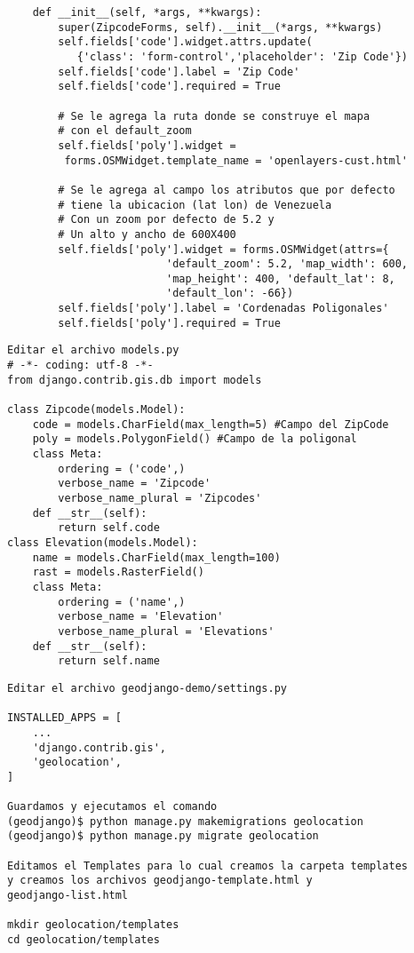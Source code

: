 \documentclass[xcolor=dvipsnames]{beamer}
\begin{document}
\begin{frame}[fragile]
\begin{verbatim}
    def __init__(self, *args, **kwargs):
        super(ZipcodeForms, self).__init__(*args, **kwargs)
        self.fields['code'].widget.attrs.update(
           {'class': 'form-control','placeholder': 'Zip Code'})
        self.fields['code'].label = 'Zip Code'
        self.fields['code'].required = True

        # Se le agrega la ruta donde se construye el mapa 
        # con el default_zoom
        self.fields['poly'].widget = 
         forms.OSMWidget.template_name = 'openlayers-cust.html'

        # Se le agrega al campo los atributos que por defecto 
        # tiene la ubicacion (lat lon) de Venezuela
        # Con un zoom por defecto de 5.2 y
        # Un alto y ancho de 600X400
        self.fields['poly'].widget = forms.OSMWidget(attrs={
                         'default_zoom': 5.2, 'map_width': 600,
                         'map_height': 400, 'default_lat': 8,
                         'default_lon': -66})
        self.fields['poly'].label = 'Cordenadas Poligonales'
        self.fields['poly'].required = True
\end{verbatim}
\end{frame}

\begin{frame}[fragile]
\begin{verbatim}
Editar el archivo models.py
# -*- coding: utf-8 -*-
from django.contrib.gis.db import models

class Zipcode(models.Model):
    code = models.CharField(max_length=5) #Campo del ZipCode
    poly = models.PolygonField() #Campo de la poligonal
    class Meta:
        ordering = ('code',)
        verbose_name = 'Zipcode'
        verbose_name_plural = 'Zipcodes'
    def __str__(self):
        return self.code
class Elevation(models.Model):
    name = models.CharField(max_length=100)
    rast = models.RasterField()
    class Meta:
        ordering = ('name',)
        verbose_name = 'Elevation'
        verbose_name_plural = 'Elevations'
    def __str__(self):
        return self.name
\end{verbatim}
\end{frame}

\begin{frame}[fragile]
\begin{verbatim}
Editar el archivo geodjango-demo/settings.py

INSTALLED_APPS = [
    ...
    'django.contrib.gis',
    'geolocation',
]

Guardamos y ejecutamos el comando 
(geodjango)$ python manage.py makemigrations geolocation
(geodjango)$ python manage.py migrate geolocation

Editamos el Templates para lo cual creamos la carpeta templates
y creamos los archivos geodjango-template.html y 
geodjango-list.html

mkdir geolocation/templates
cd geolocation/templates

\end{verbatim}
\end{frame}
\end{document}
